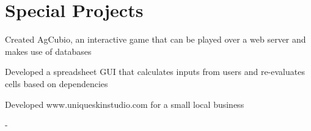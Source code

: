 \documentclass[letterpaper]{outline} %
\begin{document}
\begin{minipage}[t]{0.64\textwidth}
\begin{tightitemize}
\end{tightitemize}

\sectionspace %


\section{Special Projects} 
\sectionspace
\begin{tightitemize}
\item Created AgCubio, an interactive game that can be played over a web server and makes use of databases
\item Developed a spreadsheet GUI that calculates inputs from users and re-evaluates cells based on dependencies
\item Developed www.uniqueskinstudio.com for a small local business
\end{tightitemize}

\sectionspace %

\end{minipage} %
-
\end{document}
